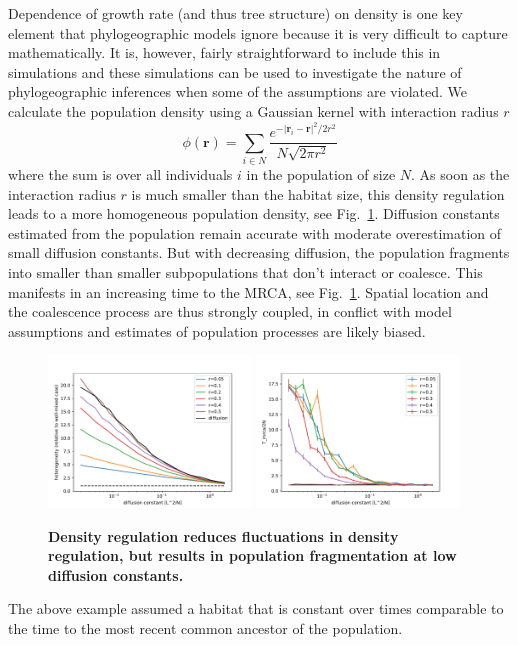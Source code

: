 \documentclass[aps,rmp, onecolumn]{revtex4}
\newcommand{\rvec}{\mathbf{r}}
\begin{document}
Dependence of growth rate (and thus tree structure) on density is one key element that phylogeographic models ignore because it is very difficult to capture mathematically.
It is, however, fairly straightforward to include this in simulations and these simulations can be used to investigate the nature of phylogeographic inferences when some of the assumptions are violated.
We calculate the population density using a Gaussian kernel with interaction radius $r$
\begin{equation}
    \phi(\rvec) = \sum_{i\in N} \frac{e^{-|\rvec_i - \rvec|^2/2r^2}}{N\sqrt{2\pi r^2}}
\end{equation}
where the sum is over all individuals $i$ in the population of size $N$.
As soon as the interaction radius $r$ is much smaller than the habitat size, this density regulation leads to a more homogeneous population density, see Fig.~\ref{fig:density_reg}.
Diffusion constants estimated from the population remain accurate with moderate overestimation of small diffusion constants.
But with decreasing diffusion, the population fragments into smaller than smaller subpopulations that don't interact or coalesce.
This manifests in an increasing time to the MRCA, see Fig.~\ref{fig:density_reg}.
Spatial location and the coalescence process are thus strongly coupled, in conflict with model assumptions and estimates of population processes are likely biased.

\begin{figure}
    \includegraphics[width=0.48\textwidth]{figures/density_reg_heterogeneity.pdf}
    \includegraphics[width=0.48\textwidth]{figures/density_reg_tmrca.pdf}
    \caption{\label{fig:density_reg} {\bf Density regulation reduces fluctuations in density regulation, but results in population fragmentation at low diffusion constants.}}
\end{figure}

The above example assumed a habitat that is constant over times comparable to the time to the most recent common ancestor of the population.
\end{document}
